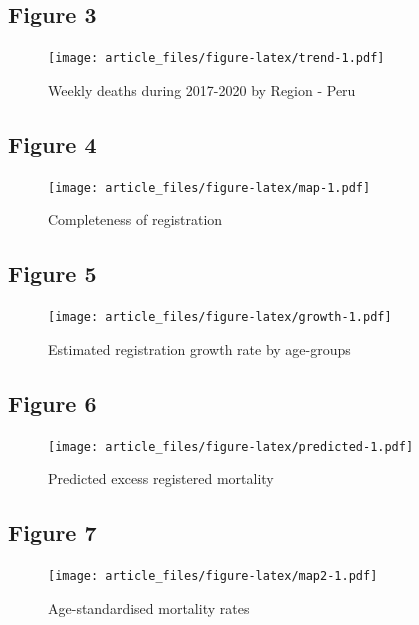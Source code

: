 \documentclass[
]{article}
\begin{document}
\hypertarget{figure-3}{%
\subsection{Figure 3}\label{figure-3}}

\begin{figure}
\centering
\texttt{[image: article\_files/figure-latex/trend-1.pdf]}
\caption{\label{fig:trend}Weekly deaths during 2017-2020 by Region - Peru}
\end{figure}

\hypertarget{figure-4}{%
\subsection{Figure 4}\label{figure-4}}

\begin{figure}
\centering
\texttt{[image: article\_files/figure-latex/map-1.pdf]}
\caption{\label{fig:map}Completeness of registration}
\end{figure}

\hypertarget{figure-5}{%
\subsection{Figure 5}\label{figure-5}}

\begin{figure}
\centering
\texttt{[image: article\_files/figure-latex/growth-1.pdf]}
\caption{\label{fig:growth}Estimated registration growth rate by age-groups}
\end{figure}

\hypertarget{figure-6}{%
\subsection{Figure 6}\label{figure-6}}

\begin{figure}
\centering
\texttt{[image: article\_files/figure-latex/predicted-1.pdf]}
\caption{\label{fig:predicted}Predicted excess registered mortality}
\end{figure}

\hypertarget{figure-7}{%
\subsection{Figure 7}\label{figure-7}}

\begin{figure}
\centering
\texttt{[image: article\_files/figure-latex/map2-1.pdf]}
\caption{\label{fig:map2}Age-standardised mortality rates}
\end{figure}
\end{document}
